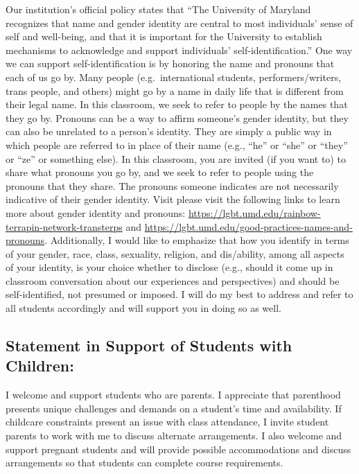 \documentclass[
]{book}
\begin{document}
Our institution's official policy states that ``The University of Maryland recognizes that name and gender identity are central to most individuals' sense of self and well-being, and that it is important for the University to establish mechanisms to acknowledge and support individuals' self-identification.'' One way we can support self-identification is by honoring the name and pronouns that each of us go by. Many people (e.g.~international students, performers/writers, trans people, and others) might go by a name in daily life that is different from their legal name. In this classroom, we seek to refer to people by the names that they go by. Pronouns can be a way to affirm someone's gender identity, but they can also be unrelated to a person's identity. They are simply a public way in which people are referred to in place of their name (e.g., ``he'' or ``she'' or ``they'' or ``ze'' or something else). In this classroom, you are invited (if you want to) to share what pronouns you go by, and we seek to refer to people using the pronouns that they share. The pronouns someone indicates are not necessarily indicative of their gender identity. Visit please visit the following links to learn more about gender identity and pronouns: \url{https://lgbt.umd.edu/rainbow-terrapin-network-transterps} and \url{https://lgbt.umd.edu/good-practices-names-and-pronouns}. Additionally, I would like to emphasize that how you identify in terms of your gender, race, class, sexuality, religion, and dis/ability, among all aspects of your identity, is your choice whether to disclose (e.g., should it come up in classroom conversation about our experiences and perspectives) and should be self-identified, not presumed or imposed. I will do my best to address and refer to all students accordingly and will support you in doing so as well.

\hypertarget{statement-in-support-of-students-with-children}{%
\subsection{Statement in Support of Students with Children:}\label{statement-in-support-of-students-with-children}}

I welcome and support students who are parents. I appreciate that parenthood presents unique challenges and demands on a student's time and availability. If childcare constraints present an issue with class attendance, I invite student parents to work with me to discuss alternate arrangements. I also welcome and support pregnant students and will provide possible accommodations and discuss arrangements so that students can complete course requirements.
\end{document}
